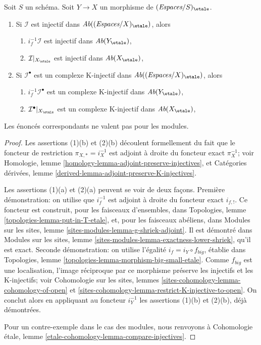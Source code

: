 \begin{lemma}
\label{lemma-compare-injectives}
Soit $S$ un schéma.
Soit $Y \to X$ un morphisme de $(\textit{Espaces}/S)_\etale$.
\begin{enumerate}
\item Si $\mathcal{I}$ est injectif dans
$\textit{Ab}((\textit{Espaces}/X)_\etale)$, alors
\begin{enumerate}
\item $i_f^{-1}\mathcal{I}$ est injectif dans $\textit{Ab}(Y_\etale)$,
\item $\mathcal{I}|_{X_\etale}$ est injectif dans $\textit{Ab}(X_\etale)$,
\end{enumerate}
\item Si $\mathcal{I}^\bullet$ est un complexe K-injectif
dans $\textit{Ab}((\textit{Espaces}/X)_\etale)$, alors
\begin{enumerate}
\item $i_f^{-1}\mathcal{I}^\bullet$ est un complexe K-injectif dans
$\textit{Ab}(Y_\etale)$,
\item $\mathcal{I}^\bullet|_{X_\etale}$ est un complexe K-injectif dans
$\textit{Ab}(X_\etale)$,
\end{enumerate}
\end{enumerate}
Les énoncés correspondants ne valent pas pour les modules.
\end{lemma}

\begin{proof}
Les assertions (1)(b) et (2)(b) découlent formellement du fait que le foncteur
de restriction $\pi_{X, *} = i_X^{-1}$ est adjoint à droite du foncteur exact
$\pi_X^{-1}$; voir Homologie, lemme
\ref{homology-lemma-adjoint-preserve-injectives}, et Catégories dérivées,
lemme \ref{derived-lemma-adjoint-preserve-K-injectives}.

\medskip\noindent
Les assertions (1)(a) et (2)(a) peuvent se voir de deux façons.
Première démonstration: on utilise que $i_f^{-1}$ est adjoint à droite du
foncteur exact $i_{f, !}$. Ce foncteur est construit, pour les faisceaux
d'ensembles, dans Topologies, lemme \ref{topologies-lemma-put-in-T-etale},
et, pour les faisceaux abéliens, dans Modules sur les sites, lemme
\ref{sites-modules-lemma-g-shriek-adjoint}. Il est démontré dans Modules sur
les sites, lemme \ref{sites-modules-lemma-exactness-lower-shriek}, qu'il est exact.
Seconde démonstration: on utilise l'égalité $i_f = i_Y \circ f_{big}$,
établie dans Topologies, lemme
\ref{topologies-lemma-morphism-big-small-etale}. Comme $f_{big}$ est une
localisation, l'image réciproque par ce morphisme préserve les injectifs et les
K-injectifs; voir Cohomologie sur les sites, lemmes
\ref{sites-cohomology-lemma-cohomology-of-open} et
\ref{sites-cohomology-lemma-restrict-K-injective-to-open}.
On conclut alors en appliquant au foncteur $i_Y^{-1}$ les assertions (1)(b)
et (2)(b), déjà démontrées.

\medskip\noindent
Pour un contre-exemple dans le cas des modules, nous renvoyons à
Cohomologie étale, lemme \ref{etale-cohomology-lemma-compare-injectives}.
\end{proof}


